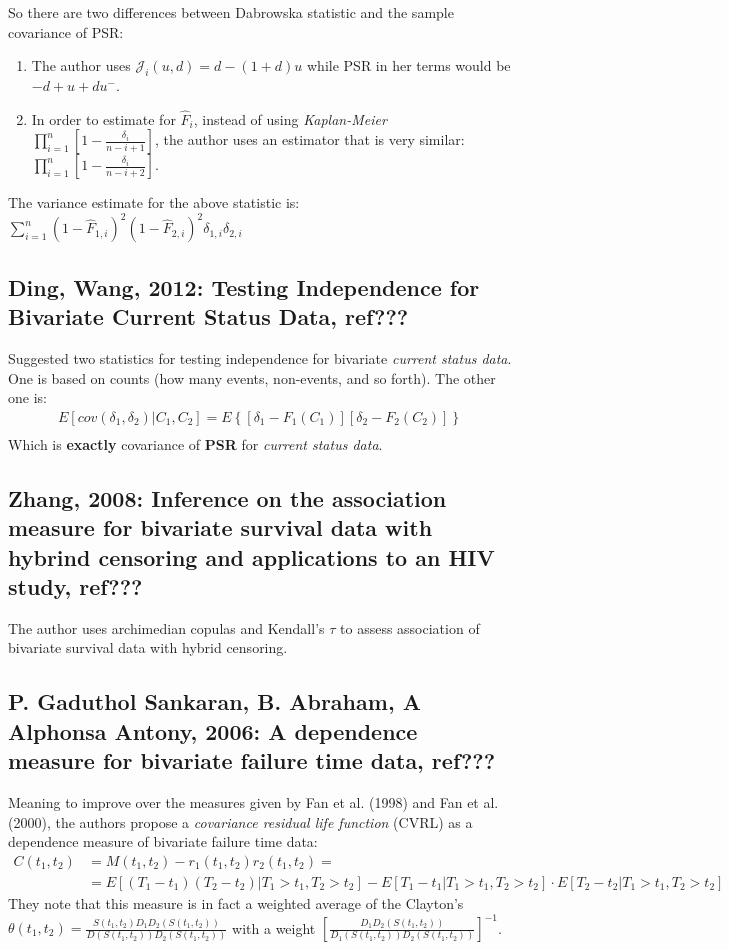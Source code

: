 \documentclass[]{article}
\begin{document}
So there are two differences between Dabrowska statistic and the sample covariance of PSR:
\begin{enumerate}[1)]
  \item The author uses $\mathcal{J}_i(u,d) =d-(1+d)u$ while PSR in her terms would be $-d + u + du^-$.
  \item In order to estimate for $\hat{F}_i$, instead of using \emph{Kaplan-Meier} $\prod_{i=1}^n \left[ 1 - \frac{\delta_i}{n - i + 1} \right]$, the author uses an estimator that is very similar: $\prod_{i=1}^n \left[ 1 - \frac{\delta_i}{n - i + 2} \right]$. 
\end{enumerate}
The variance estimate for the above statistic is: $\sum_{i=1}^n \left( 1 - \hat{F}_{1,i} \right)^2  \left( 1 - \hat{F}_{2,i} \right)^2 \delta_{1,i} \delta_{2,i}$


\subsection{Ding, Wang, 2012: Testing Independence for Bivariate Current Status Data, ref???}
Suggested two statistics for testing independence for bivariate \emph{current status data}. One is based on counts (how many events, non-events, and so forth). The other one is:
	$$
	\begin{aligned}
		 E[cov(\delta_1, \delta_2)|C_1,C_2] = E\left\{ [\delta_1 - F_1(C_1)][\delta_2 - F_2(C_2)]  \right\}\\
	\end{aligned}
	$$
Which is \textbf{exactly} covariance of \textbf{PSR} for \emph{current status data}.

\subsection{Zhang, 2008: Inference on the association measure for bivariate survival data with hybrind censoring and applications to an HIV study, ref???}
The author uses archimedian copulas and Kendall's $\tau$ to assess association of bivariate survival data with hybrid censoring.

\subsection{P. Gaduthol Sankaran, B. Abraham, A Alphonsa Antony, 2006: A dependence measure for bivariate failure time data, ref???}
Meaning to improve over the measures given by Fan et al. (1998) and Fan et al. (2000), the authors propose a \emph{covariance residual life function} (CVRL) as a dependence measure of bivariate failure time data:
	$$
	\begin{aligned}
		 C(t_1, t_2) &= M(t_1, t_2) - r_1(t_1, t_2) r_2(t_1, t_2) =\\
		  &=E[(T_1-t_1)(T_2-t_2)|T_1>t_1,T_2>t_2] - E[T_1-t_1|T_1>t_1,T_2>t_2]\cdot E[T_2-t_2|T_1>t_1,T_2>t_2]
	\end{aligned}
	$$
They note that this measure is in fact a weighted average of the Clayton's $\theta(t_1,t_2) = \frac{S(t_1,t_2)D_1D_2(S(t_1,t_2))}{D(S(t_1,t_2))D_2(S(t_1,t_2))}$ with a weight $\left[ \frac{D_1D_2(S(t_1,t_2))}{D_1(S(t_1,t_2))D_2(S(t_1,t_2))} \right]^{-1}$.
\end{document}
